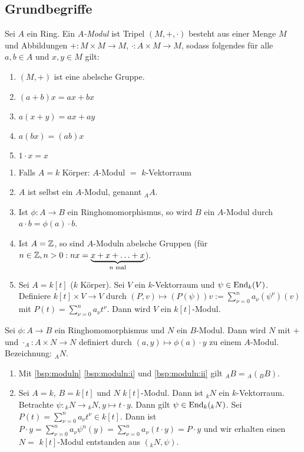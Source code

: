 \documentclass[12pt,a4paper]{scrartcl}
\theoremstyle{cplain}
\theoremstyle{cdef}
\begin{document}
\subsection{Grundbegriffe}
\begin{defi}
    Sei $A$ ein Ring. Ein \emph{$A$-Modul} ist Tripel $(M, +, \cdot)$ besteht aus einer Menge $M$ und Abbildungen $+: M\times M \rightarrow M$, $\cdot: A\times M \rightarrow M$, sodass folgendes für alle $a,b\in A$ und $x,y \in M$ gilt:
    \begin{enumerate}
        \item $(M,+)$ ist eine abelsche Gruppe.
        \item $(a+b)x=ax+bx$
        \item $a(x+y)=ax+ay$
        \item $a(bx)=(ab)x$
        \item $1\cdot x=x$
    \end{enumerate}
\end{defi}
\begin{bsp} \label{bsp:moduln}
    \leavevmode
    \begin{enumerate}
        \item Falls $A=k$ Körper: $A$-Modul $=$ $k$-Vektorraum \label{bsp:moduln:i}
        \item $A$ ist selbst ein $A$-Modul, genannt ${}_AA$. \label{bsp:moduln:ii}
        \item Ist $\phi: A\rightarrow B$ ein Ringhomomorphismus, so wird $B$ ein $A$-Modul durch $a\cdot b = \phi(a)\cdot b$.
        \item Ist $A=\mathbb Z$, so sind $A$-Moduln abelsche Gruppen (für $n\in \mathbb Z, n>0: nx=\underbrace{x+x+\ldots+x}_{n\text{ mal}}$).
        \item Sei $A=k[t]$ ($k$ Körper). Sei $V$ ein $k$-Vektorraum und $\psi \in \operatorname{End}_k(V)$. Definiere $k[t] \times V \rightarrow V$ durch $(P,v) \mapsto (P(\psi))v:=\sum_{\nu=0}^n a_\nu(\psi^\nu)(v)$ mit $P(t)=\sum_{\nu=0}^n a_\nu t^\nu$. Dann wird $V$ ein $k[t]$-Modul.
    \end{enumerate}
\end{bsp}
\begin{defi}
    Sei $\phi: A\rightarrow B$ ein Ringhomomorphismus und $N$ ein $B$-Modul. Dann wird $N$ mit $+$ und $\cdot_A: A\times N\rightarrow N$ definiert durch $(a, y) \mapsto \phi(a)\cdot y$ zu einem $A$-Modul. Bezeichnung: ${}_AN$.
\end{defi}
\begin{bsp}
    \leavevmode
    \begin{enumerate}
        \item Mit \cref{bsp:moduln} \ref{bsp:moduln:i} und \ref{bsp:moduln:ii} gilt ${}_AB={}_A({}_BB)$.
        \item Sei $A=k$, $B=k[t]$ und $N$ $k[t]$-Modul.
        Dann ist ${}_kN$ ein $k$-Vektorraum.
        Betrachte $\psi: {}_kN \to {}_kN, y\mapsto t\cdot y$. Dann gilt $\psi\in \operatorname{End}_k({}_kN)$.
        Sei $P(t)=\sum_{\nu=0}^n a_\nu t^\nu\in k[t]$. Dann ist $P\cdot y = \sum_{\nu = 0}^n a_\nu \psi^n(y) = \sum_{\nu = 0}^n a_\nu (t\cdot y) = P\cdot y$ und wir erhalten einen $N = $ $k[t]$-Modul entstanden aus $({}_kN, \psi)$.
    \end{enumerate}
\end{bsp}
\end{document}
